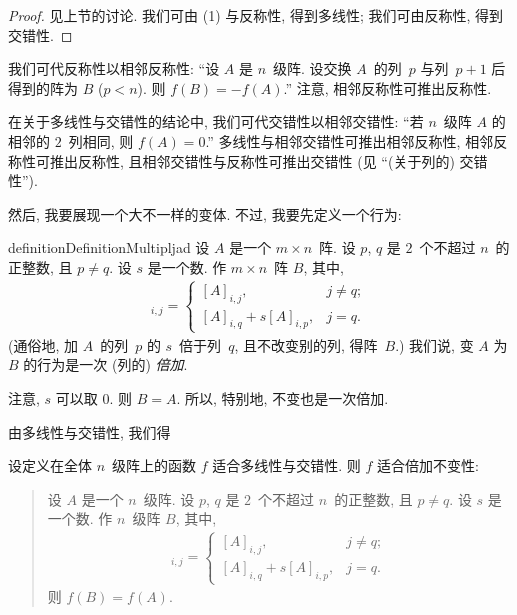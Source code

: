 \documentclass[../libro.tex]{subfiles}
\begin{document}
\begin{proof}
    见上节的讨论.
    我们可由 (1) 与反称性,
    得到多线性;
    我们可由反称性,
    得到交错性.
\end{proof}

我们可代反称性以相邻反称性:
``设 \(A\) 是 \(n\)~级阵.
设交换 \(A\)~的列~\(p\) 与列~\(p+1\) 后得到的阵为 \(B\)
(\(p < n\)).
则 \(f(B) = -f(A)\).''
注意, 相邻反称性可推出反称性.

在关于多线性与交错性的结论中,
我们可代交错性以相邻交错性:
``若 \(n\)~级阵 \(A\) 的相邻的 \(2\)~列相同,
则 \(f(A) = 0\).''
多线性与相邻交错性可推出相邻反称性,
相邻反称性可推出反称性,
且相邻交错性与反称性可推出交错性
(见 ``(关于列的) 交错性'').

然后, 我要展现一个大不一样的变体.
不过, 我要先定义一个行为:

\begin{restatable}[倍加]{definition}{DefinitionMultipljad}
    设 \(A\) 是一个 \(m \times n\)~阵.
    设 \(p\), \(q\) 是 \(2\)~个不超过 \(n\)~的正整数,
    且 \(p \neq q\).
    设 \(s\) 是一个数.
    作 \(m \times n\)~阵 \(B\), 其中,
    \begin{align*}
        [B]_{i,j} =
        \begin{cases}
            [A]_{i,j},              & j \neq q; \\
            [A]_{i,q} + s[A]_{i,p}, & j = q.
        \end{cases}
    \end{align*}
    (通俗地, %
    加 \(A\)~的列~\(p\) 的 \(s\)~倍于列~\(q\),
    且不改变别的列,
    得阵~\(B\).) %
    我们说, 变 \(A\) 为 \(B\) 的行为是一次 (列的) \emph{倍加}.
\end{restatable}


注意, \(s\) 可以取 \(0\).
则 \(B = A\).
所以, 特别地, 不变也是一次倍加.

由多线性与交错性, 我们得

\begin{theorem}
    设定义在全体 \(n\)~级阵上的函数 \(f\)
    适合多线性与交错性.
    则 \(f\) 适合倍加不变性:
    \begin{quotation}
        设 \(A\) 是一个 \(n\)~级阵.
        设 \(p\), \(q\) 是 \(2\)~个不超过 \(n\)~的正整数,
        且 \(p \neq q\).
        设 \(s\) 是一个数.
        作 \(n\)~级阵 \(B\), 其中,
        \begin{align*}
            [B]_{i,j} =
            \begin{cases}
                [A]_{i,j},              & j \neq q; \\
                [A]_{i,q} + s[A]_{i,p}, & j = q.
            \end{cases}
        \end{align*}
        则 \(f(B) = f(A)\).
    \end{quotation}
\end{theorem}
\end{document}
